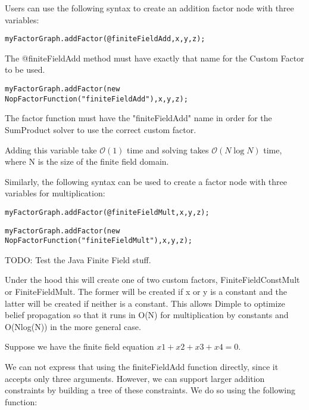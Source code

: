 \fi


Users can use the following syntax to create an addition factor node with three variables:

\ifmatlab
\begin{lstlisting}
myFactorGraph.addFactor(@finiteFieldAdd,x,y,z);
\end{lstlisting}

The @finiteFieldAdd method must have exactly that name for the Custom Factor to be used.
\fi

\ifjava
\begin{lstlisting}
myFactorGraph.addFactor(new NopFactorFunction("finiteFieldAdd"),x,y,z);
\end{lstlisting}

The factor function must have the "finiteFieldAdd" name in order for the SumProduct solver to use the correct custom factor.
\fi

Adding this variable take $\mathcal{O}(1)$ time and solving takes $\mathcal{O}(N\log N)$ time, where N is the size of the finite field domain.


Similarly, the following syntax can be used to create a factor node with three variables for multiplication:

\ifmatlab
\begin{lstlisting}
myFactorGraph.addFactor(@finiteFieldMult,x,y,z);
\end{lstlisting}
\fi

\ifjava
\begin{lstlisting}
myFactorGraph.addFactor(new NopFactorFunction("finiteFieldMult"),x,y,z);
\end{lstlisting}
\fi

TODO: Test the Java Finite Field stuff.

Under the hood this will create one of two custom factors, FiniteFieldConstMult or FiniteFieldMult. The former will be created if x or y is a constant and the latter will be created if neither is a constant. This allows Dimple to optimize belief propagation so that it runs in O(N) for multiplication by constants and O(Nlog(N)) in the more general case.

\ifmatlab


Suppose we have the finite field equation $ x1+x2+x3+x4=0 $.

We can not express that using the finiteFieldAdd function directly, since it accepts only three arguments. However, we can support larger addition constraints by building a tree of these constraints. We do so using the following function:

